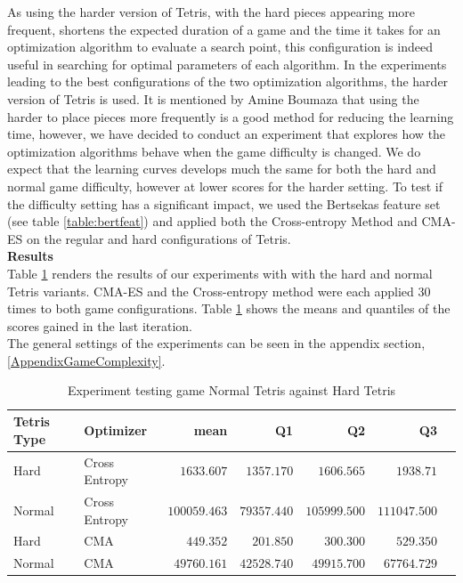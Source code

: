 As using the harder version of Tetris, with the hard pieces appearing more frequent, shortens
the expected duration of a game and  the time it takes for an optimization algorithm 
to evaluate a search point, this configuration is indeed useful in searching for optimal parameters
of each algorithm. In the experiments leading to the best configurations of the two 
optimization algorithms, the harder version of Tetris is used. It is mentioned
by Amine Boumaza that using the harder to place pieces more frequently is a good method
for reducing the learning time, however, we have decided to conduct an experiment that explores
how the optimization algorithms behave when the game difficulty is changed.
We do expect that the learning curves develops much the same 
for both the hard and normal game difficulty, however
at lower scores for the harder setting.
To test if the difficulty setting has a significant impact, we used the Bertsekas
feature set (see table \ref{table:bertfeat}) and applied both the Cross-entropy 
Method and CMA-ES on the regular and hard configurations of Tetris.\\

\textbf{Results}\\
Table \ref{table:difficultyRes} renders the results of our experiments 
with with the hard and normal Tetris variants. CMA-ES and the Cross-entropy method 
were each applied 30 times to both game configurations. Table \ref{table:difficultyRes}
shows the means and quantiles of the scores gained in the last iteration.\\
The general settings of the experiments can be seen in the appendix section, \ref{AppendixGameComplexity}.

\begin{table}[H]
\centering
\small
\begin{tabular}{l l r r r r r}
Tetris Type & Optimizer & mean & Q1 & Q2 & Q3\\
\hline
Hard & Cross Entropy & $1633.607$ & $1357.170$ & $1606.565$ & $1938.71$\\
Normal & Cross Entropy & $100059.463$ & $79357.440$ & $105999.500$ & $111047.500$\\
Hard & CMA & $449.352$ & $201.850$ & $300.300$ & $529.350$\\
Normal & CMA & $49760.161$ & $42528.740$ & $49915.700$ & $67764.729$\\
\end{tabular}
\caption{Experiment testing game Normal Tetris against Hard Tetris \label{table:difficultyRes}}
\end{table}

